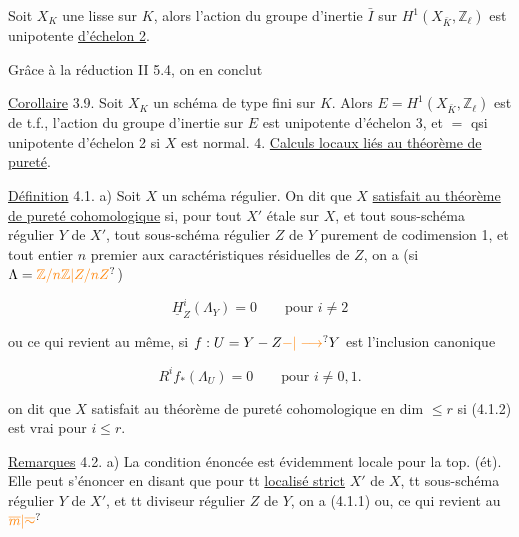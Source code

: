  Soit $X_K$ une    lisse sur $K$, alors l'action du groupe d'inertie $\bar I$ sur $H^1(X_{\bar K},\mathbb Z_\ell)$ est  unipotente \uline{d'échelon 2}.

Grâce à la réduction II 5.4, on en conclut

\uline{Corollaire} 3.9. Soit $X_K$ un schéma  de type fini sur $K$. Alors $E=H^1(X_{\bar K},\mathbb Z_\ell)$ est de t.f.,  l'action du groupe d'inertie sur $E$ est  unipotente d'échelon 3,  et $=$ qsi unipotente d'échelon 2 si $X$ est normal.
4. \uline{Calculs  locaux liés au théorème de pureté}.

\uline{Définition} 4.1. a) Soit $X$ un schéma régulier. On dit que $X$ \uline{satisfait au théorème de pureté cohomologique} si, pour tout  $X'$ étale sur $X$, et tout  sous-schéma régulier $Y$ de $X'$,  tout sous-schéma régulier $Z$ de $Y$ purement de codimension 1,   et tout entier $n$ premier aux  caractéristiques résiduelles de $Z$, on a (si $\Lambda=\unsure{\mathbb Z/n\mathbb Z|Z/nZ}$)

\[
\underline H^i_Z(\Lambda_Y)=0\qquad\text{pour }i\ne 2
\tag*{(4.1.1)}
\]

ou ce qui revient au même, si $f:U=Y-Z\unsure{{-}|\longrightarrow}Y$ est l'inclusion canonique

\[
R^i f_*(\Lambda_U)=0\qquad\text{pour }i\ne 0,1.
\tag*{(4.1.2)}
\]

  on dit que $X$ satisfait au théorème de pureté cohomologique en dim $\leq r$ si  (4.1.2) est vrai pour $i\leq r$.

\uline{Remarques} 4.2. a) La condition énoncée   est  évidemment locale pour la top. (ét). Elle peut s'énoncer  en disant que pour tt \uline{localisé strict} $X'$ de $X$, tt sous-schéma régulier $Y$ de $X'$, et tt diviseur régulier $Z$ de $Y$,  on a (4.1.1) ou, ce qui revient au $\unsure{\overline{m}|\overline{\sim}}$

